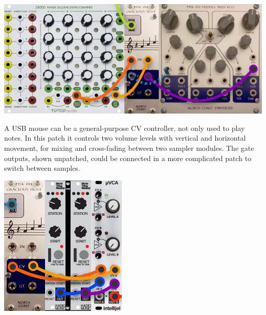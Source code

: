 \nopagebreak\noindent
{\hspace*{\fill}\includegraphics[scale=0.35]{patch4.png}\hspace*{\fill}\par} 

A USB mouse can be a general-purpose CV controller, not only used to play
notes.  In this patch it controls two volume levels with vertical and
horizontal movement, for mixing and cross-fading between two sampler
modules.  The gate outputs, shown unpatched, could be connected in a more
complicated patch to switch between samples.

\nopagebreak\noindent
{\hspace*{\fill}\includegraphics[scale=0.4]{patch5.png}\hspace*{\fill}\par} 
